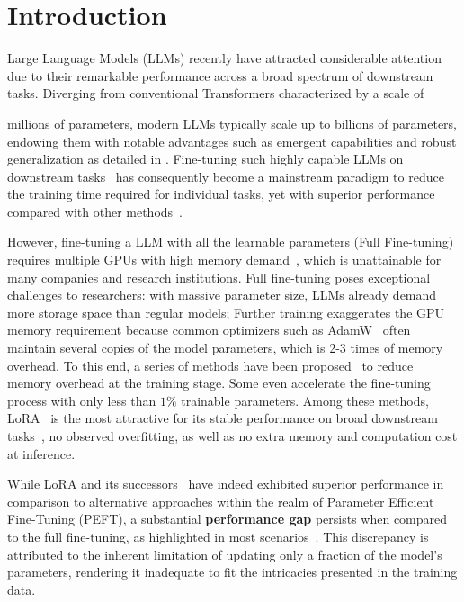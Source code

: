 \section{Introduction}
Large Language Models (LLMs) recently have attracted considerable attention due to their remarkable performance across a broad spectrum of downstream tasks. Diverging from conventional Transformers characterized by a scale of {millions of parameters, modern LLMs typically scale up to billions of parameters, endowing them with notable advantages such as emergent capabilities and robust generalization as detailed in \citep{gpt4_bubeck2023sparks}. Fine-tuning such highly capable LLMs on downstream tasks~\citep{t5_raffel2020exploring,bert_devlin-etal-2019-bert,gpt2_radford2019language,debertav3_he2021debertav3,roberta_liu2019roberta,gpt3_brown2020language} has consequently become a mainstream paradigm to reduce the training time required for individual tasks, yet with superior performance compared with other methods~\citep{prompt_tuning_lester2021power,prefix_tuning_li2021prefix,adpter_houlsby2019parameter}.

However, fine-tuning a LLM with all the learnable parameters (Full Fine-tuning) requires multiple GPUs with high memory demand~\citep{qlora_dettmers2023qlora, lora_hu2022lora}, which is unattainable for many companies and research institutions. Full fine-tuning poses exceptional challenges to researchers: with massive parameter size, LLMs already demand more storage space than regular models; Further training exaggerates the GPU memory requirement because common optimizers such as AdamW~\cite{adamw_loshchilov2017decoupled} often maintain several copies of the model parameters, which is 2-3 times of memory overhead. To this end, a series of methods have been proposed~\citep{dylora_valipour2023dylora,adalora_zhang2022adaptive,prefix_tuning_li2021prefix,IA_3_liu2022few,update_model_on_the_flow_lv2023parameter,qlora_dettmers2023qlora,p_tuning_liu-etal-2022-p,bitfit_zaken2021bitfit,adapterfusion_pfeiffer2021adapterfusion,diff_pruning_guo2021parameter,adpter_houlsby2019parameter,adamix_wang2022adamix}  to reduce memory overhead at the training stage. Some even accelerate the fine-tuning process with only less than $1\%$ trainable parameters. Among these methods, LoRA~\citep{lora_hu2022lora} is the most attractive for its stable performance on broad downstream tasks~\citep{deltatuning_ding2022delta}, no observed overfitting, as well as no extra memory and computation cost at inference.

While LoRA and its successors~\citep{adalora_zhang2022adaptive,dylora_valipour2023dylora} have indeed exhibited superior performance in comparison to alternative approaches within the realm of Parameter Efficient Fine-Tuning (PEFT), a substantial \textbf{performance gap} persists when compared to the full fine-tuning, as highlighted in most scenarios~\citep{deltatuning_ding2022delta}. This discrepancy is attributed to the inherent limitation of updating only a fraction of the model's parameters, rendering it inadequate to fit the intricacies presented in the training data. 

}
